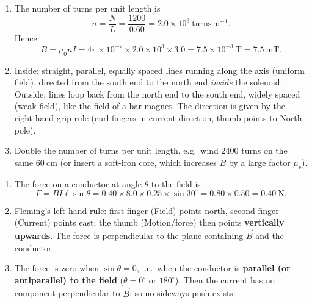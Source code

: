 \documentclass[11pt]{article}
\newcounter{popsec}
\newcounter{popsub}
\newcommand{\courssub}[1]{%
  \stepcounter{popsub}%
  \par\vspace{9pt}\noindent{\popxbold\fontsize{11.5}{13}\selectfont\color{popink}{\color{poporange}\thepopsec.\thepopsub}\hspace{6pt}#1}\par\nopagebreak\vspace{4pt}
}
\begin{document}
\begin{corrige}
\begin{enumerate}
\item The number of turns per unit length is
\[ n = \frac{N}{L} = \frac{1200}{0.60} = 2.0 \times 10^{3}\ \mathrm{turns\,m^{-1}}. \]
Hence
\[ B = \mu_0 n I = 4\pi \times 10^{-7} \times 2.0 \times 10^{3} \times 3.0 = 7.5 \times 10^{-3}\ \mathrm{T} = 7.5\ \mathrm{mT}. \]
\item Inside: straight, parallel, equally spaced lines running along the axis (uniform field), directed from the south end to the north end \emph{inside} the solenoid. Outside: lines loop back from the north end to the south end, widely spaced (weak field), like the field of a bar magnet. The direction is given by the right-hand grip rule (curl fingers in current direction, thumb points to North pole).
\item Double the number of turns per unit length, e.g.\ wind $2400$ turns on the same $60\ \mathrm{cm}$ (or insert a soft-iron core, which increases $B$ by a large factor $\mu_r$).
\end{enumerate}
\end{corrige}

\courssub{I practise}

\begin{corrige}
\begin{enumerate}
\item The force on a conductor at angle $\theta$ to the field is
\[ F = B I \ell \sin\theta = 0.40 \times 8.0 \times 0.25 \times \sin 30^\circ = 0.80 \times 0.50 = 0.40\ \mathrm{N}. \]
\item Fleming's left-hand rule: first finger (Field) points north, second finger (Current) points east; the thumb (Motion/force) then points \textbf{vertically upwards}. The force is perpendicular to the plane containing $\vec{B}$ and the conductor.
\item The force is zero when $\sin\theta = 0$, i.e.\ when the conductor is \textbf{parallel (or antiparallel) to the field} ($\theta = 0^\circ$ or $180^\circ$). Then the current has no component perpendicular to $\vec{B}$, so no sideways push exists.
\end{enumerate}
\end{corrige}
\end{document}
